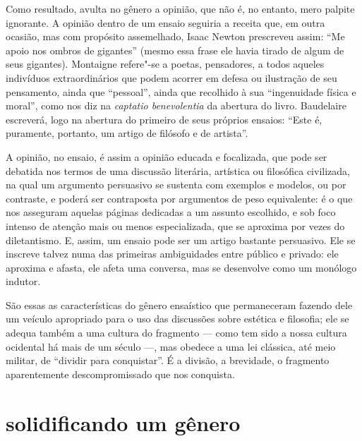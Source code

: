 Como resultado, avulta no gênero a opinião, que não é, no entanto, mero
palpite ignorante. A opinião dentro de um ensaio seguiria a receita
que, em outra ocasião, mas com propósito assemelhado, Isaac Newton
prescreveu assim: “Me apoio nos ombros de gigantes” (mesmo essa frase
ele havia tirado de algum de seus gigantes). Montaigne refere"-se a poetas,
pensadores, a todos aqueles indivíduos extraordinários que podem acorrer
em defesa ou ilustração de seu pensamento, ainda que “pessoal”, ainda
que recolhido à sua “ingenuidade física e moral”, como nos diz na
\textit{captatio benevolentia} da abertura do livro. Baudelaire
escreverá, logo na abertura do primeiro de seus próprios ensaios: “Este
é, puramente, portanto, um artigo de filósofo e de artista”.

A opinião, no ensaio, é assim a opinião educada e focalizada, que pode
ser debatida nos termos de uma discussão literária, artística ou
filosófica civilizada, na qual um argumento persuasivo se sustenta com
exemplos e modelos, ou por contraste, e poderá ser contraposta por
argumentos de peso equivalente: é o que nos asseguram aquelas páginas
dedicadas a um assunto escolhido, e sob foco intenso de atenção mais ou
menos especializada, que se aproxima por vezes do diletantismo. E,
assim, um ensaio pode ser um artigo bastante persuasivo. Ele se
inscreve talvez numa das primeiras ambiguidades entre público e
privado: ele aproxima e afasta, ele afeta uma conversa, mas se
desenvolve como um monólogo indutor.

São essas as características do gênero ensaístico que permaneceram
fazendo dele um veículo apropriado para o uso das discussões sobre
estética e filosofia; ele se adequa também a uma cultura do fragmento
--- como tem sido a nossa cultura ocidental há mais de um século ---,
mas obedece a uma lei clássica, até meio militar, de “dividir para
conquistar”. É a divisão, a brevidade, o fragmento aparentemente
descompromissado que nos conquista.

\section{solidificando um gênero}

